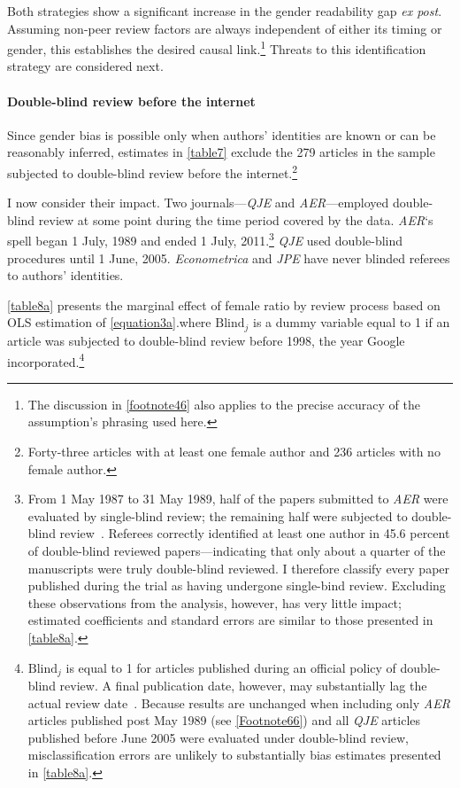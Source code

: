 Both strategies show a significant increase in the gender readability gap \emph{ex post}. Assuming non-peer review factors are always independent of either its timing or gender, this establishes the desired causal link.\footnote{The discussion in \autoref{footnote46} also applies to the precise accuracy of the assumption's phrasing used here.} Threats to this identification strategy are considered next.

\paragraph{Double-blind review before the internet}
\label{doubleblind}

Since gender bias is possible only when authors' identities are known or can be reasonably inferred, estimates in \autoref{table7} exclude the 279 articles in the sample subjected to double-blind review before the internet.\footnote{Forty-three articles with at least one female author and 236 articles with no female author.}

I now consider their impact. Two journals---\emph{QJE} and \emph{AER}---employed double-blind review at some point during the time period covered by the data. \emph{AER}`s spell began 1 July, 1989 and ended 1 July, 2011.\footnote{\label{Footnote66}From 1 May 1987 to 31 May 1989, half of the papers submitted to \emph{AER} were evaluated by single-blind review; the remaining half were subjected to double-blind review~\citep[for details on the trial, see][]{Blank1991}. Referees correctly identified at least one author in 45.6 percent of double-blind reviewed papers---indicating that only about a quarter of the manuscripts were truly double-blind reviewed. I therefore classify every paper published during the trial as having undergone single-bind review. Excluding these observations from the analysis, however, has very little impact; estimated coefficients and standard errors are similar to those presented in \autoref{table8a}.} \emph{QJE} used double-blind procedures until 1 June, 2005. \emph{Econometrica} and \emph{JPE} have never blinded referees to authors' identities.

\autoref{table8a} presents the marginal effect of female ratio by review process based on OLS estimation of \autoref{equation3a}.where $\text{Blind}_j$ is a dummy variable equal to 1 if an article was subjected to double-blind review before 1998, the year Google incorporated.\footnote{$\text{Blind}_j$ is equal to 1 for articles published during an official policy of double-blind review. A final publication date, however, may substantially lag the actual review date~\citep[for an illustration and discussion, see][]{Blank1991}. Because results are unchanged when including only \emph{AER} articles published post May 1989 (see \autoref{Footnote66}) and all \emph{QJE} articles published before June 2005 were evaluated under double-blind review, misclassification errors are unlikely to substantially bias estimates presented in \autoref{table8a}.}


